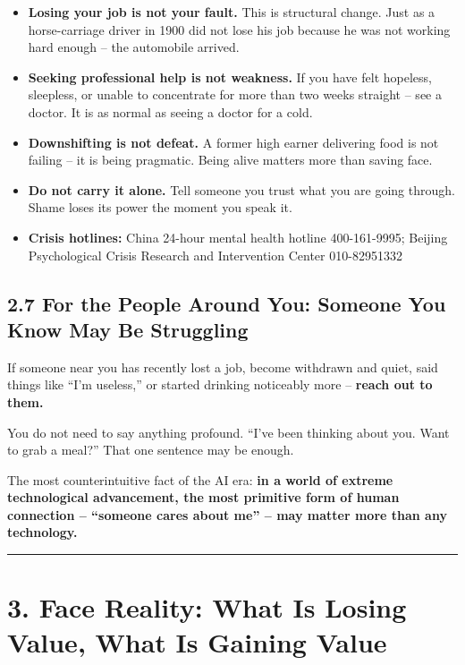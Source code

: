 \begin{itemize}
\tightlist
\item
  \textbf{Losing your job is not your fault.} This is structural change.
  Just as a horse-carriage driver in 1900 did not lose his job because
  he was not working hard enough -- the automobile arrived.
\item
  \textbf{Seeking professional help is not weakness.} If you have felt
  hopeless, sleepless, or unable to concentrate for more than two weeks
  straight -- see a doctor. It is as normal as seeing a doctor for a
  cold.
\item
  \textbf{Downshifting is not defeat.} A former high earner delivering
  food is not failing -- it is being pragmatic. Being alive matters more
  than saving face.
\item
  \textbf{Do not carry it alone.} Tell someone you trust what you are
  going through. Shame loses its power the moment you speak it.
\item
  \textbf{Crisis hotlines:} China 24-hour mental health hotline
  400-161-9995; Beijing Psychological Crisis Research and Intervention
  Center 010-82951332
\end{itemize}

\subsection{2.7 For the People Around You: Someone You Know May Be
Struggling}\label{for-the-people-around-you-someone-you-know-may-be-struggling}

If someone near you has recently lost a job, become withdrawn and quiet,
said things like ``I'm useless,'' or started drinking noticeably more --
\textbf{reach out to them.}

You do not need to say anything profound. ``I've been thinking about
you. Want to grab a meal?'' That one sentence may be enough.

The most counterintuitive fact of the AI era: \textbf{in a world of
extreme technological advancement, the most primitive form of human
connection -- ``someone cares about me'' -- may matter more than any
technology.}

\begin{center}\rule{0.5\linewidth}{0.5pt}\end{center}

\section{3. Face Reality: What Is Losing Value, What Is Gaining
Value}\label{face-reality-what-is-losing-value-what-is-gaining-value}

